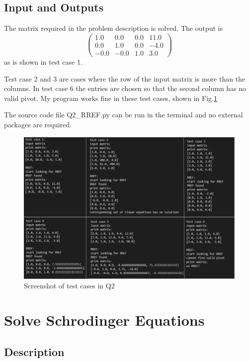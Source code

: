 \documentclass{article}
\begin{document}
\subsection{Input and Outputs}

The matrix required in the problem description is solved. The output is 
\begin{equation}
\begin{pmatrix}
1.0& 0.0& 0.0& 11.0\\
0.0& 1.0& 0.0& -4.0\\
-0.0& -0.0& 1.0& 3.0
\end{pmatrix}
\end{equation}
as is shown in test case 1.
\par
Test case 2 and 3 are cases where the row of the input matrix is more than the columns. In test case 6 the entries are chosen so that the second column has no valid pivot. My program works fine in these test cases, shown in Fig.\ref{fig:Q2screenshot}\par
The source code file Q2\_RREF.py can be run in the terminal and no external packages are required.

\begin{figure}[ht]
    \centering
    \includegraphics[width=1\textwidth]{Q2screenshot.png}
    \caption{Screenshot of test cases in Q2}
    \label{fig:Q2screenshot}
\end{figure}
\newpage

\section{Solve Schrodinger Equations}

\subsection{Description}
\end{document}
